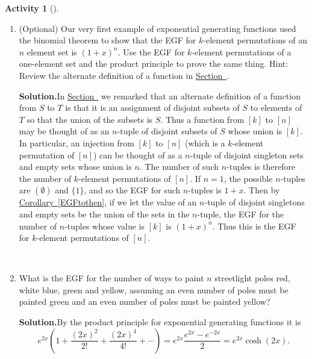 \documentclass[10pt,]{book}
\theoremstyle{plain}
\theoremstyle{definition}
\newtheorem{activity}[project]{Activity}
\numberwithin{equation}{chapter}
\begin{document}
\begin{activity}[]\label{activity-364}
~\par
\begin{enumerate}[label=(\alph*)]
 \item (Optional) Our very first example of exponential generating functions used the binomial theorem to show that the EGF for \(k\)-element permutations of an \(n\) element set is \((1+x)^n\). Use the EGF for \(k\)-element permutations of a one-element set and the product principle to prove the same thing. Hint: Review the alternate definition of a function in \hyperref[orderedfunctionsection]{Section~}.%
\par\medskip\noindent%
\textbf{Solution.}\quad In \hyperref[orderedfunctionsection]{Section~} we remarked that an alternate definition of a function from \(S\) to \(T\) is that it is an assignment of disjoint subsets of \(S\) to elements of \(T\) so that the union of the subsets is \(S\). Thus a function from \([k]\) to \([n]\) may be thought of as an \(n\)-tuple of disjoint subsets of \(S\) whose union is \([k]\). In particular, an injection from \([k]\) to \([n]\) (which is a \(k\)-element permutation of \([n]\)) can be thought of as a \(n\)-tuple of disjoint singleton sets and empty sets whose union is \(n\). The number of such \(n\)-tuples is therefore the number of \(k\)-element permutations of \([n]\). If \(n=1\), the possible \(n\)-tuples are \((\emptyset)\) and \(\{1\}\), and so the EGF for such \(n\)-tuples is \(1+x\). Then by \hyperref[EGFtothen]{Corollary~\ref{EGFtothen}}, if we let the value of an \(n\)-tuple of disjoint singletons and empty sets be the union of the sets in the \(n\)-tuple, the EGF for the number of \(n\)-tuples whose value is \([k]\) is \((1+x)^n\). Thus this is the EGF for \(k\)-element permutations of \([n]\).%

~\par
\item What is the EGF for the number of ways to paint \(n\) streetlight poles red, white blue, green and yellow, assuming an even number of poles must be painted green and an even number of poles must be painted yellow?%
\par\medskip\noindent%
\textbf{Solution.}\quad By the product principle for exponential generating functions it is%
\begin{equation*}
e^{2x}\left(1+\frac{(2x)^2}{2!}+ \frac{(2x)^4}{4!} + \cdots \right) =
e^{2x}\frac{e^{2x}-e^{-2x}}{2}=e^{2x}\cosh(2x).
\end{equation*}
%

\end{enumerate}
\end{activity}
\end{document}
